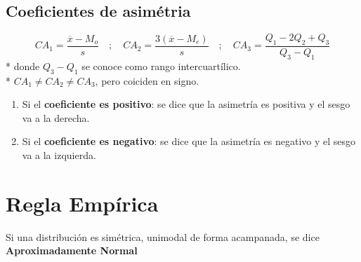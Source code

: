 \documentclass{templateNote}
\begin{document}
\subsection{Coeficientes de asimétria}
\begin{equation*}
    CA_1 = \frac{\overline{x} - M_o}{s} \quad ; \quad
    CA_2 = \frac{3(\overline{x} - M_e)}{s} \quad ; \quad
    CA_3 = \frac{Q_1 - 2Q_2 + Q_3}{Q_3 - Q_1}
\end{equation*}
* donde $Q_3 - Q_1$ se conoce como rango intercuartílico. \\
* $CA_1 \ne CA_2 \ne CA_3$, pero coiciden en signo.\\
\begin{enumerate}
    \item Si el \textbf{coeficiente es positivo}: se dice que la asimetría es positiva y el sesgo va a la derecha.
    \item Si el \textbf{coeficiente es negativo}: se dice que la asimetría es negativo y el sesgo va a la izquierda.
\end{enumerate}

\section{Regla Empírica}
\indent
Si una distribución es simétrica, unimodal de forma acampanada, se dice \textbf{Aproximadamente Normal}
\end{document}
